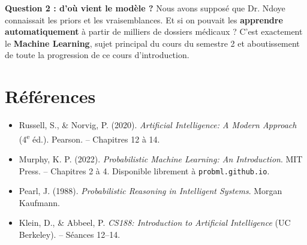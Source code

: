 \documentclass[11pt,a4paper]{article}
\begin{document}
\textbf{Question 2 : d'où vient le modèle ?} Nous avons supposé que Dr. Ndoye connaissait les priors et les vraisemblances. Et si on pouvait les \textbf{apprendre automatiquement} à partir de milliers de dossiers médicaux ? C'est exactement le \textbf{Machine Learning}, sujet principal du cours du semestre 2 et aboutissement de toute la progression de ce cours d'introduction.

\section*{Références}

\begin{itemize}
    \item Russell, S., \& Norvig, P. (2020). \textit{Artificial Intelligence: A Modern Approach} (4\textsuperscript{e} éd.). Pearson. -- Chapitres 12 à 14.

    \item Murphy, K. P. (2022). \textit{Probabilistic Machine Learning: An Introduction}. MIT Press. -- Chapitres 2 à 4. Disponible librement à \texttt{probml.github.io}.

    \item Pearl, J. (1988). \textit{Probabilistic Reasoning in Intelligent Systems}. Morgan Kaufmann.

    \item Klein, D., \& Abbeel, P. \textit{CS188: Introduction to Artificial Intelligence} (UC Berkeley). -- Séances 12--14.
\end{itemize}
\end{document}

